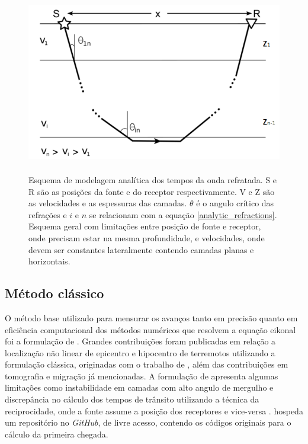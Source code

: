 \begin{figure}[H]
	\centering
	\includegraphics[width = 14cm, height = 8cm]{Imgs/RevisaoBibliografica/refracted_analytic.png}
	\caption{Esquema de modelagem analítica dos tempos da onda refratada. S e R são as posições da fonte e do receptor respectivamente. V e Z são as velocidades e as espessuras das camadas. $\theta$ é o angulo crítico das refrações e $i$ e $n$ se relacionam com a equação \ref{analytic_refractions}. Esquema geral com limitações entre posição de fonte e receptor, onde precisam estar na mesma profundidade, e velocidades, onde devem ser constantes lateralmente contendo camadas planas e horizontais.}
	\label{fig:refracted_analytic}
\end{figure}

\subsection*{Método clássico}

O método base utilizado para mensurar os avanços tanto em precisão quanto em eficiência computacional dos métodos numéricos que resolvem a equação eikonal foi a formulação de . Grandes contribuições foram publicadas em relação a localização não linear de epicentro e hipocentro de terremotos utilizando a formulação clássica, originadas com o trabalho de  , além das contribuições em tomografia e migração já mencionadas. A formulação de  apresenta algumas limitações como instabilidade em camadas com alto angulo de mergulho \cite{afnimar2000finite} e discrepância no cálculo dos tempos de trânsito utilizando a técnica da reciprocidade, onde a fonte assume a posição dos receptores e vice-versa \cite{tryggvason2006travel}.  hospeda um repositório no \textit{GitHub}, de livre acesso, contendo os códigos originais para o cálculo da primeira chegada.  

